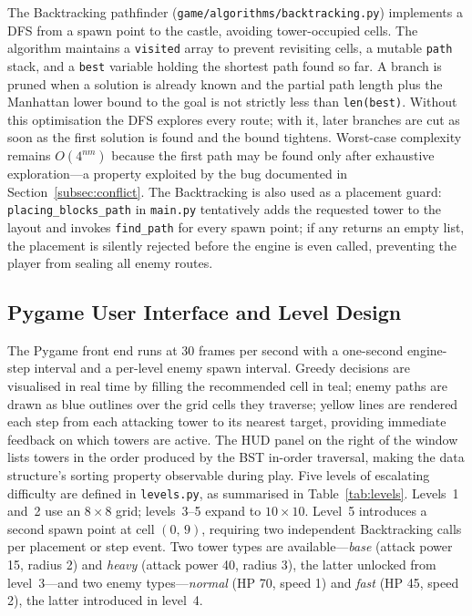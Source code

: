 \documentclass[conference]{IEEEtran}
\begin{document}
The Backtracking pathfinder (\texttt{game/algorithms/backtracking.py}) implements
a DFS from a spawn point to the castle, avoiding tower-occupied cells.
The algorithm maintains a \texttt{visited} array to prevent revisiting cells, a
mutable \texttt{path} stack, and a \texttt{best} variable holding the shortest
path found so far.
A branch is pruned when a solution is already known and the partial path length
plus the Manhattan lower bound to the goal is not strictly less than
\texttt{len(best)}.
Without this optimisation the DFS explores every route; with it, later branches
are cut as soon as the first solution is found and the bound tightens.
Worst-case complexity remains $O(4^{nm})$ because the first path may be found
only after exhaustive exploration—a property exploited by the bug documented
in Section~\ref{subsec:conflict}.
The Backtracking is also used as a placement guard: \texttt{placing\_blocks\_path}
in \texttt{main.py} tentatively adds the requested tower to the layout and
invokes \texttt{find\_path} for every spawn point; if any returns an empty list,
the placement is silently rejected before the engine is even called, preventing
the player from sealing all enemy routes.

\subsection{Pygame User Interface and Level Design}

The Pygame front end runs at 30 frames per second with a one-second engine-step
interval and a per-level enemy spawn interval.
Greedy decisions are visualised in real time by filling the recommended cell in
teal; enemy paths are drawn as blue outlines over the grid cells they traverse;
yellow lines are rendered each step from each attacking tower to its nearest
target, providing immediate feedback on which towers are active.
The HUD panel on the right of the window lists towers in the order produced by
the BST in-order traversal, making the data structure's sorting property
observable during play.
Five levels of escalating difficulty are defined in \texttt{levels.py}, as
summarised in Table~\ref{tab:levels}.
Levels~1 and~2 use an $8\times 8$ grid; levels~3--5 expand to $10\times 10$.
Level~5 introduces a second spawn point at cell $(0,\,9)$, requiring two
independent Backtracking calls per placement or step event.
Two tower types are available—\emph{base} (attack power 15, radius 2) and
\emph{heavy} (attack power 40, radius 3), the latter unlocked from level~3—and
two enemy types—\emph{normal} (HP 70, speed 1) and \emph{fast}
(HP 45, speed 2), the latter introduced in level~4.
\end{document}
